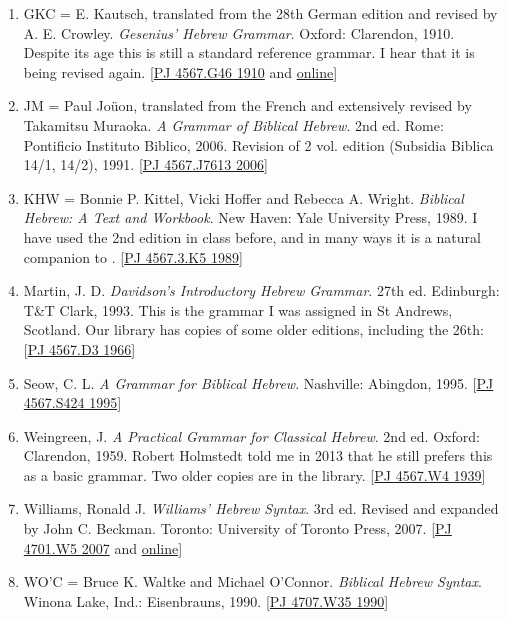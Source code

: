 \documentclass[titlepage]{article}
\begin{document}
\begin{enumerate}
\item
  GKC = E. Kautsch, translated from the 28th German edition and revised
  by A. E. Crowley. \emph{Gesenius' Hebrew Grammar}. Oxford: Clarendon,
  1910. Despite its age this is still a standard reference grammar. I
  hear that it is being revised again.
  [\href{http://tyndale.worldcat.org/oclc/748712337}{PJ 4567.G46 1910} and \href{http://tyndale.worldcat.org/oclc/575651}{online}]
\item
  JM = Paul Joüon, translated from the French and extensively revised by
  Takamitsu Muraoka. \emph{A Grammar of Biblical Hebrew}. 2nd ed. Rome:
  Pontificio Instituto Biblico, 2006. Revision of 2 vol. edition
  (Subsidia Biblica 14/1, 14/2), 1991.
  [\href{http://tyndale.worldcat.org/oclc/76949728}{PJ 4567.J7613 2006}]
\item
  KHW = Bonnie P. Kittel, Vicki Hoffer and Rebecca A. Wright.
  \emph{Biblical Hebrew: A Text and Workbook}. New Haven: Yale
  University Press, 1989. I have used the 2nd edition in class before,
  and in many ways it is a natural companion to \cite{bz}.
  [\href{http://tyndale.worldcat.org/oclc/18557541}{PJ 4567.3.K5 1989}]
\item
  Martin, J. D. \emph{Davidson's Introductory Hebrew Grammar}. 27th ed.
  Edinburgh: T\&T Clark, 1993. This is the grammar I was assigned in St
  Andrews, Scotland. Our library has copies of some older editions,
  including the 26th:
  [\href{http://tyndale.worldcat.org/oclc/456246}{PJ 4567.D3 1966}]
\item
  Seow, C. L. \emph{A Grammar for Biblical Hebrew}. Nashville: Abingdon,
  1995.
  [\href{http://tyndale.worldcat.org/oclc/32854250}{PJ 4567.S424 1995}]
\item
  Weingreen, J. \emph{A Practical Grammar for Classical Hebrew}. 2nd ed.
  Oxford: Clarendon, 1959. Robert Holmstedt told me in 2013 that he
  still prefers this as a basic grammar. Two older copies are in the
  library.
  [\href{http://tyndale.worldcat.org/oclc/926806}{PJ 4567.W4 1939}]
\item
  Williams, Ronald J. \emph{Williams' Hebrew Syntax}. 3rd ed. Revised
  and expanded by John C. Beckman. Toronto: University of Toronto Press,
  2007.
  [\href{http://tyndale.worldcat.org/oclc/84989344}{PJ 4701.W5 2007} and \href{http://ezproxy.mytyndale.ca:2048/login?url=http://search.ebscohost.com/login.aspx?direct=true&db=e093mww&AN=682592&site=ehost-live&scope=site}{online}]
\item
  WO'C = Bruce K. Waltke and Michael O'Connor. \emph{Biblical Hebrew
  Syntax}. Winona Lake, Ind.: Eisenbrauns, 1990.
  [\href{http://tyndale.worldcat.org/oclc/20088442}{PJ 4707.W35 1990}]
\end{enumerate}
\end{document}
